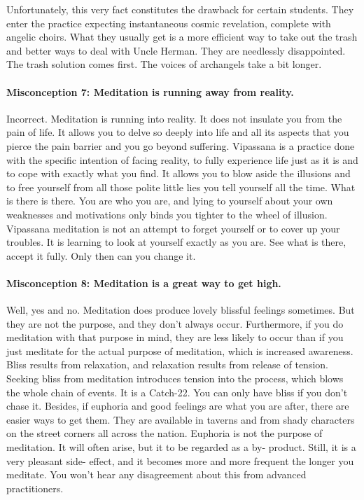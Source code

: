 Unfortunately, this very fact constitutes the drawback for certain students.
They enter the practice expecting instantaneous cosmic revelation, complete with
angelic choirs. What they usually get is a more efficient way to take out the
trash and better ways to deal with Uncle Herman. They are needlessly
disappointed. The trash solution comes first. The voices of archangels take a
bit longer.

\paragraph*{Misconception 7: Meditation is running away from reality.}
Incorrect. Meditation is running into reality. It does not insulate you from the pain of life. It
allows you to delve so deeply into life and all its aspects that you pierce the
pain barrier and you go beyond suffering. Vipassana is a practice done with the
specific intention of facing reality, to fully experience life just as it is and
to cope with exactly what you find. It allows you to blow aside the illusions
and to free yourself from all those polite little lies you tell yourself all the
time. What is there is there. You are who you are, and lying to yourself about
your own weaknesses and motivations only binds you tighter to the wheel of
illusion.  Vipassana meditation is not an attempt to forget yourself or to cover up your
troubles. It is learning to look at yourself exactly as you are. See what is
there, accept it fully. Only then can you change it.

\paragraph*{Misconception 8: Meditation is a great way to get high.} 
Well, yes and no.  Meditation does produce lovely blissful feelings sometimes.
But they are not the purpose, and they don't always occur. Furthermore, if you
do meditation with that purpose in mind, they are less likely to occur than if
you just meditate for the actual purpose of meditation, which is increased
awareness. Bliss results from relaxation, and relaxation results from release of
tension. Seeking bliss from meditation introduces tension into the process,
which blows the whole chain of events. It is a Catch-22. You can only have bliss
if you don't chase it. Besides, if euphoria and good feelings are what you are
after, there are easier ways to get them. They are available in taverns and from
shady characters on the street corners all across the nation.  Euphoria is not
the purpose of meditation. It will often arise, but it to be regarded as a by-
product. Still, it is a very pleasant side- effect, and it becomes more and more
frequent the longer you meditate. You won't hear any disagreement about this
from advanced practitioners.

